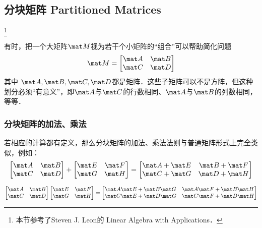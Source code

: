 
\begin{issues}
\issueDraft
\end{issues}

\subsection{分块矩阵 Partitioned Matrices}
\footnote{本节参考了Steven J. Leon的 Linear Algebra with Applications．}

有时，把一个大矩阵$\mat M$视为若干个小矩阵的“组合”可以帮助简化问题
\begin{equation}
\mat M = 
\begin{bmatrix}
\mat A & \mat B\\
\mat C & \mat D\\
\end{bmatrix}
\end{equation}
其中 $\mat A, \mat B, \mat C, \mat D$都是矩阵．这些子矩阵可以不是方阵，但这种划分必须“有意义”，即$\mat A$与$\mat C$的行数相同、$\mat A$与$\mat B$的列数相同，等等．

\subsubsection{分块矩阵的加法、乘法}
若相应的计算都有定义，那么分块矩阵的加法、乘法法则与普通矩阵形式上完全类似，例如：
\begin{equation}
\begin{bmatrix}
\mat A & \mat B\\
\mat C & \mat D\\
\end{bmatrix}
+
\begin{bmatrix}
\mat E & \mat F\\
\mat G & \mat H\\
\end{bmatrix}
=
\begin{bmatrix}
\mat A +\mat E & \mat B +\mat F\\
\mat C +\mat G & \mat D +\mat H\\
\end{bmatrix}
\end{equation}

\begin{equation}
\begin{bmatrix}
\mat A & \mat B\\
\mat C & \mat D\\
\end{bmatrix}
\begin{bmatrix}
\mat E & \mat F\\
\mat G & \mat H\\
\end{bmatrix}
=
\begin{bmatrix}
\mat A \mat E +\mat B \mat G & \mat A \mat F +\mat B \mat H \\
\mat C \mat E +\mat D \mat G  & \mat C \mat F +\mat D \mat H \\
\end{bmatrix}
\end{equation}

